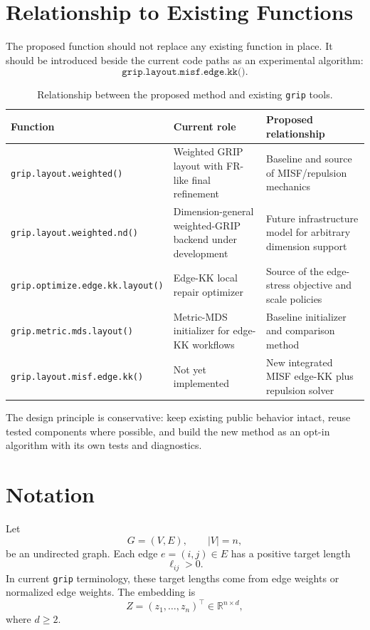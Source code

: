 \documentclass[11pt]{article}
\newcommand{\grip}{\texttt{grip}}
\newcommand{\Rfunc}[1]{\texttt{#1}}
\newcommand{\RR}{\mathbb{R}}
\begin{document}
\section{Relationship to Existing Functions}

The proposed function should not replace any existing function in place.
It should be introduced beside the current code paths as an experimental
algorithm:
\[
  \Rfunc{grip.layout.misf.edge.kk()}.
\]

\begin{table}[h]
\centering
\begin{tabular}{lll}
\toprule
Function & Current role & Proposed relationship \\
\midrule
\Rfunc{grip.layout.weighted()} &
Weighted GRIP layout with FR-like final refinement &
Baseline and source of MISF/repulsion mechanics \\
\Rfunc{grip.layout.weighted.nd()} &
Dimension-general weighted-GRIP backend under development &
Future infrastructure model for arbitrary dimension support \\
\Rfunc{grip.optimize.edge.kk.layout()} &
Edge-KK local repair optimizer &
Source of the edge-stress objective and scale policies \\
\Rfunc{grip.metric.mds.layout()} &
Metric-MDS initializer for edge-KK workflows &
Baseline initializer and comparison method \\
\Rfunc{grip.layout.misf.edge.kk()} &
Not yet implemented &
New integrated MISF edge-KK plus repulsion solver \\
\bottomrule
\end{tabular}
\caption{Relationship between the proposed method and existing \grip{} tools.}
\end{table}

The design principle is conservative: keep existing public behavior intact,
reuse tested components where possible, and build the new method as an
opt-in algorithm with its own tests and diagnostics.

\section{Notation}

Let
\[
  G=(V,E), \qquad |V|=n,
\]
be an undirected graph. Each edge \(e=(i,j)\in E\) has a positive target length
\[
  \ell_{ij} > 0.
\]
In current \grip{} terminology, these target lengths come from edge weights or
normalized edge weights. The embedding is
\[
  Z = (z_1,\ldots,z_n)^\top \in \RR^{n\times d},
\]
where \(d \ge 2\).
\end{document}
